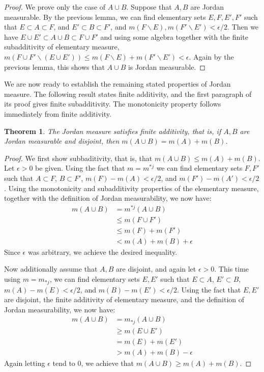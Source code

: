 \documentclass[11pt,oneside]{amsbook}
\renewcommand{\setminus}{\smallsetminus}
\theoremstyle{definition}
\theoremstyle{plain}
\newtheorem{thm}{Theorem}[section]
\theoremstyle{definition}
\theoremstyle{remark}
\numberwithin{equation}{section}
\numberwithin{figure}{section}
\begin{document}
\begin{proof}
  We prove only the case of $A\cup B$. Suppose that $A,B$ are Jordan measurable. By the previous lemma, we can find elementary sets $E,F,E',F'$ such that $E\subset A\subset F$, and $E'\subset B\subset F'$, and $m(F\setminus E),m(F'\setminus E')<\epsilon/2$. Then we have $E\cup E'\subset A\cup B\subset F\cup F'$ and using some algebra together with the finite subadditivity of elementary measure, $m(F\cup F'\setminus(E\cup E'))\leq m(F\setminus E)+m(F'\setminus E')<\epsilon$. Again by the previous lemma, this shows that $A\cup B$ is Jordan measurable.
\end{proof}

We are now ready to establish the remaining stated properties of Jordan measure. The following result states finite additivity, and the first paragraph of its proof gives finite subadditivity. The monotonicity property follows immediately from finite additivity.

\begin{thm}
  The Jordan measure satisfies finite additivity, that is, if $A,B$ are Jordan measurable and disjoint, then $m(A\cup B)=m(A)+m(B)$.
\end{thm}

\begin{proof}
  We first show subbaditivity, that is, that $m(A\cup B)\leq m(A)+m(B)$. Let $\epsilon>0$ be given. Using the fact that $m=m^{*j}$ we can find elementary sets $F,F'$ such that $A\subset F$, $B\subset F'$, $m(F)-m(A)<\epsilon/2$, and $m(F')-m(A')<\epsilon/2$. Using the monotonicity and subadditivity properties of the elementary measure, together with the definition of Jordan measurability, we now have:
  \begin{align*}
    m(A\cup B)&=m^{*j}(A\cup B)\\
              &\leq m(F\cup F')\\
              &\leq m(F)+m(F')\\
              &<m(A)+m(B)+\epsilon
  \end{align*}
  Since $\epsilon$ was arbitrary, we achieve the desired inequality.

  Now additionally assume that $A,B$ are disjoint, and again let $\epsilon>0$. This time using $m=m_{*j}$, we can find elementary sets $E,E'$ such that $E\subset A$, $E'\subset B$, $m(A)-m(E)<\epsilon/2$, and $m(B)-m(E')<\epsilon/2$. Using the fact that $E,E'$ are disjoint, the finite additivity of elementary measure, and the definition of Jordan measurability, we now have:
  \begin{align*}
    m(A\cup B)&=m_{*j}(A\cup B)\\
              &\geq m(E\cup E')\\
              &=m(E)+m(E')\\
              &>m(A)+m(B)-\epsilon
  \end{align*}
  Again letting $\epsilon$ tend to $0$, we achieve that $m(A\cup B)\geq m(A)+m(B)$.
\end{proof}
\end{document}
